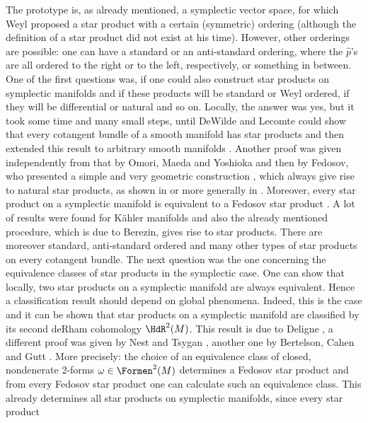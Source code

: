 The prototype is, as already mentioned, a symplectic vector space, for which 
Weyl proposed a star product with a certain (symmetric) ordering (although the 
definition of a star product did not exist at his time). However, other 
orderings are possible: one can have a standard or an anti-standard ordering, 
where the $\hat p$'s are all ordered to the right or to the left, respectively, or 
something in  between. One of the first questions was, if one could also construct 
star products on symplectic manifolds and if these products will be standard or 
Weyl ordered, if they will be differential or natural and so on. Locally, the 
answer was yes, but it took some time and many small steps, until DeWilde and 
Lecomte could show that every cotangent bundle of a smooth manifold has star 
products \cite{dewilde.lecomte:1983a} and then extended this result to arbitrary 
smooth manifolds \cite{dewilde.lecomte:1983b}. Another proof was given 
independently from that by Omori, Maeda and Yoshioka 
\cite{omori.maeda.yoshioka:1991a} and then by Fedosov, who presented a simple 
and very geometric construction \cite{fedosov:1994a}, which always give rise to 
natural star products, as shown in \cite{bordemann.waldmann:1997a} 
or more generally in \cite{gutt.rawnsley:2003a}. Moreover, every star product on a 
symplectic manifold is equivalent to a Fedosov star product 
\cite{bertelson.cahen.gutt:1997a}. A lot of 
results were found for K\"ahler manifolds and also the already mentioned 
procedure, which is due to Berezin, gives rise to star products. There are 
moreover standard, anti-standard ordered and many other types of star products 
on every cotangent bundle. The next question was the one concerning the 
equivalence classes of star products in the symplectic case. One can show that 
locally, two star products on a symplectic manifold are always equivalent. Hence 
a classification result should depend on global phenomena. Indeed, this is the 
case and it can be shown that star products on a symplectic manifold are 
classified by its second deRham cohomology $\HdR^2(M)$. This result is due to 
Deligne \cite{deligne:1995a}, a different proof was given by Nest and Tsygan 
\cite{nest.tsygan:1995a}, another one by Bertelson, Cahen and Gutt 
\cite{bertelson.cahen.gutt:1997a}. More precisely: the choice of an equivalence 
class of closed, nondenerate 2-forms $\omega \in \Formen^2(M)$ determines a 
Fedosov star product and from every Fedosov 
star product one can calculate such an equivalence class. This already 
determines all star products on symplectic manifolds, since every star product 
